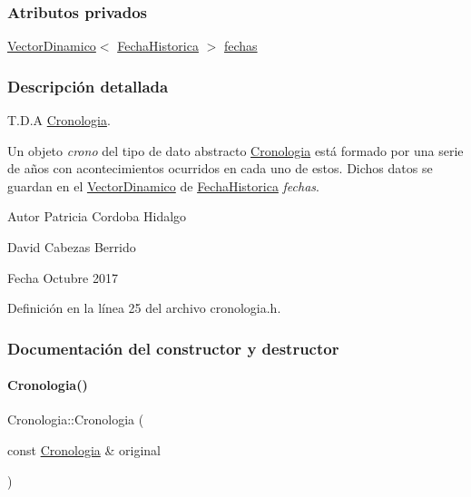 \subsubsection*{Atributos privados}
\begin{DoxyCompactItemize}
\item 
\hyperlink{classVectorDinamico}{Vector\+Dinamico}$<$ \hyperlink{classFechaHistorica}{Fecha\+Historica} $>$ \hyperlink{classCronologia_a22756c56c89a59928e5d0f84948aa58a}{fechas}
\end{DoxyCompactItemize}


\subsubsection{Descripción detallada}
T.\+D.\+A \hyperlink{classCronologia}{Cronologia}. 

Un objeto {\itshape crono} del tipo de dato abstracto {\ttfamily \hyperlink{classCronologia}{Cronologia}} está formado por una serie de años con acontecimientos ocurridos en cada uno de estos. Dichos datos se guardan en el {\ttfamily \hyperlink{classVectorDinamico}{Vector\+Dinamico}} de {\ttfamily \hyperlink{classFechaHistorica}{Fecha\+Historica}} {\itshape fechas}.

\begin{DoxyAuthor}{Autor}
Patricia Cordoba Hidalgo 

David Cabezas Berrido 
\end{DoxyAuthor}
\begin{DoxyDate}{Fecha}
Octubre 2017 
\end{DoxyDate}


Definición en la línea 25 del archivo cronologia.\+h.



\subsubsection{Documentación del constructor y destructor}
\mbox{\label{classCronologia_a4de4592918375f3053acee2317dcc711}} 
\paragraph{\texorpdfstring{Cronologia()}{Cronologia()}}
{\footnotesize\ttfamily Cronologia\+::\+Cronologia (\begin{DoxyParamCaption}\item[{const \hyperlink{classCronologia}{Cronologia} \&}]{original }\end{DoxyParamCaption})}



